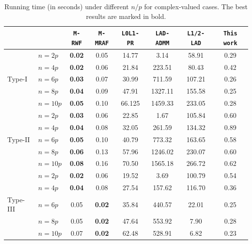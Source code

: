 \documentclass{article}
\numberwithin{equation}{section}
\begin{document}
	\begin{table}[t]
	\centering
	\caption{Running time (in seconds) under different $n/p$ for complex-valued cases. The best results are marked in bold.}\label{time2}
	\begin{tabular}{l l|c|c|c|c|c|c}
			\toprule		
		~ &~ &\verb"M-RWF"&\verb"M-MRAF"&\verb"L0L1-PR" &\verb"LAD-ADMM" &\verb"L1/2-LAD" &\verb"This work" \\ \midrule	
		&$n=2p$         &\textbf{0.02}  &0.05   &14.77    &3.14       &58.91      &0.29\\ 								
		&$n=4p$         &\textbf{0.02}  &0.06   &21.84    &223.51     &80.43      &0.42\\ 									
		Type-I&$n=6p$   &\textbf{0.03}  &0.07   &30.99    &711.59     &107.21     &0.26\\ 		
		&$n=8p$         &\textbf{0.04}  &0.09   &47.91    &1327.11    &155.58     &0.25\\	
		&$n=10p$        &\textbf{0.05}  &0.10   &66.125   &1459.33    &233.05     &0.28\\  		
		\midrule			
		&$n=2p$        &\textbf{0.03}  &0.06   &22.85   &1.67       &105.84   &0.60\\ 								
		&$n=4p$        &\textbf{0.04}  &0.08   &32.05   &261.59     &134.32   &0.89\\ 									
		Type-II&$n=6p$ &\textbf{0.05}  &0.10   &40.79   &773.32     &163.65   &0.58\\ 		
		&$n=8p$        &\textbf{0.06}  &0.13   &57.96   &1246.02    &230.07   &0.60\\	
		&$n=10p$       &\textbf{0.08}  &0.16   &70.50   &1565.18    &266.72   &0.62\\  		
	\midrule		
		&$n=2p$         &\textbf{0.02}  &0.06   &19.52   &3.69       &100.79   &0.54\\ 								
		&$n=4p$         &\textbf{0.04}  &0.08   &27.54   &157.62     &116.70   &0.36\\ 									
		Type-III&$n=6p$ &0.05  &\textbf{0.02}   &35.84   &440.57     &22.01    &0.25\\ 		
		&$n=8p$         &0.05  &\textbf{0.02}   &47.64   &553.92     &7.90     &0.28\\	
		&$n=10p$        &0.07  &\textbf{0.02}   &62.48   &528.91     &6.82     &0.23\\  		
		\bottomrule
	\end{tabular}
\end{table}	
\end{document}
